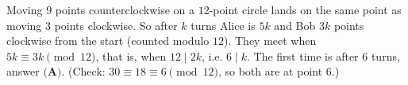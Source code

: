 Moving $9$ points counterclockwise on a $12$-point circle lands on the same point as moving $3$ points clockwise. So after $k$ turns Alice is $5k$ and Bob $3k$ points clockwise from the start (counted modulo $12$). They meet when $5k\equiv3k\pmod{12}$, that is, when $12\mid 2k$, i.e. $6\mid k$. The first time is after $\boxed{6}$ turns, answer $\textbf{(A)}$. (Check: $30\equiv18\equiv6\pmod{12}$, so both are at point $6$.)
